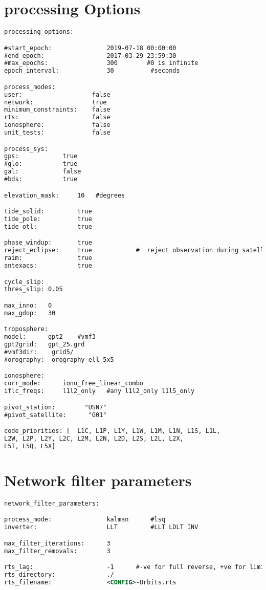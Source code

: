 \section{processing Options}

\begin{lstlisting}[language=xml,caption=yaml input files configuration example]
processing_options:

#start_epoch:               2019-07-18 00:00:00
#end_epoch:                 2017-03-29 23:59:30
#max_epochs:                300        #0 is infinite
epoch_interval:             30          #seconds

process_modes:
user:                   false
network:                true
minimum_constraints:    false
rts:                    false
ionosphere:             false
unit_tests:             false

process_sys:
gps:            true
#glo:           true
gal:            false
#bds:           true

elevation_mask:     10   #degrees

tide_solid:         true
tide_pole:          true
tide_otl:           true

phase_windup:       true
reject_eclipse:     true            #  reject observation during satellite eclipse periods
raim:               true
antexacs:           true

cycle_slip:
thres_slip: 0.05

max_inno:   0
max_gdop:   30

troposphere:
model:      gpt2    #vmf3
gpt2grid:   gpt_25.grd
#vmf3dir:    grid5/
#orography:  orography_ell_5x5

ionosphere:
corr_mode:      iono_free_linear_combo
iflc_freqs:     l1l2_only   #any l1l2_only l1l5_only

pivot_station:        "USN7"
#pivot_satellite:      "G01"

code_priorities: [  L1C, L1P, L1Y, L1W, L1M, L1N, L1S, L1L,
L2W, L2P, L2Y, L2C, L2M, L2N, L2D, L2S, L2L, L2X,
L5I, L5Q, L5X]
\end{lstlisting}

\section{Network filter parameters}
\begin{lstlisting}[language=xml,caption=yaml input files configuration example]
network_filter_parameters:

process_mode:               kalman      #lsq
inverter:                   LLT         #LLT LDLT INV

max_filter_iterations:      3
max_filter_removals:        3

rts_lag:                    -1      #-ve for full reverse, +ve for limited epochs
rts_directory:              ./
rts_filename:               <CONFIG>-Orbits.rts
\end{lstlisting}


